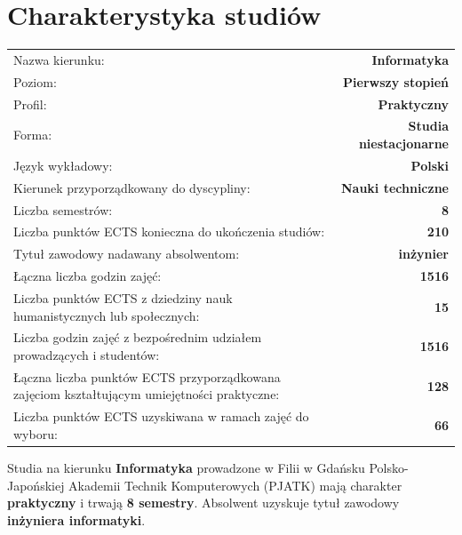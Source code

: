 \documentclass[12pt,a4paper]{article}
\renewcommand{\arraystretch}{1.35}
\begin{document}
\vspace{1cm}
\thispagestyle{empty}
\newpage
\setcounter{page}{1}

\tableofcontents
\newpage

\section{Charakterystyka studiów}

{\renewcommand{\arraystretch}{1.4}
\begin{tabularx}{\textwidth}{@{}Xr@{}}
\toprule
  {\small Nazwa kierunku:} & {\small\textbf{Informatyka}} \\
  {\small Poziom:} & {\small\textbf{Pierwszy stopień}} \\
  {\small Profil:} & {\small\textbf{Praktyczny}} \\
  {\small Forma:} & {\small\textbf{Studia niestacjonarne}} \\
  {\small Język wykładowy:} & {\small\textbf{Polski}} \\
  {\small Kierunek przyporządkowany do dyscypliny:} & {\small\textbf{Nauki techniczne}} \\
\midrule
  {\small Liczba semestrów:} & {\small\textbf{8}} \\
  {\small Liczba punktów ECTS konieczna do ukończenia studiów:} & {\small\textbf{210}} \\
  {\small Tytuł zawodowy nadawany absolwentom:} & {\small\textbf{inżynier}} \\
\midrule
  {\small Łączna liczba godzin zajęć:} & {\small\textbf{1516}} \\
  {\small Liczba punktów ECTS z dziedziny nauk humanistycznych lub społecznych:} & {\small\textbf{15}} \\
  {\small Liczba godzin zajęć z bezpośrednim udziałem prowadzących i studentów:} & {\small\textbf{1516}} \\
  {\small Łączna liczba punktów ECTS przyporządkowana zajęciom kształtującym umiejętności praktyczne:} & {\small\textbf{128}} \\
  {\small Liczba punktów ECTS uzyskiwana w ramach zajęć do wyboru:} & {\small\textbf{66}} \\
\bottomrule
\end{tabularx}}

\bigskip


\newpage

Studia na kierunku \textbf{Informatyka} prowadzone w Filii w Gdańsku Polsko-Japońskiej Akademii Technik Komputerowych (PJATK) mają charakter \textbf{praktyczny} i trwają \textbf{8 semestry}. Absolwent uzyskuje tytuł zawodowy \textbf{inżyniera informatyki}.
\end{document}

